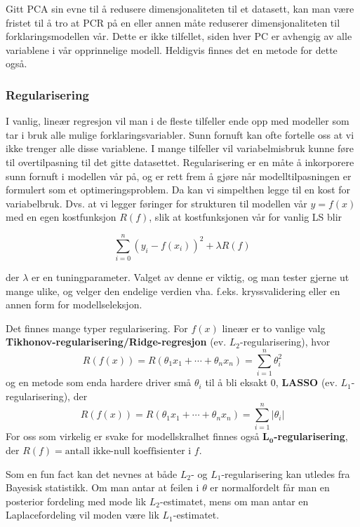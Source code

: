 Gitt PCA sin evne til å redusere dimensjonaliteten til et datasett, kan man være fristet til å tro at PCR på en eller annen måte reduserer dimensjonaliteten til forklaringsmodellen vår. Dette er ikke tilfellet, siden hver PC er avhengig av alle variablene i vår opprinnelige modell. Heldigvis finnes det en metode for dette også.

\subsubsection{Regularisering}
I vanlig, lineær regresjon vil man i de fleste tilfeller ende opp med modeller som tar i bruk alle mulige forklaringsvariabler. Sunn fornuft kan ofte fortelle oss at vi ikke trenger alle disse variablene. I mange tilfeller vil variabelmisbruk kunne føre til overtilpasning til det gitte datasettet. Regularisering er en måte å inkorporere sunn fornuft i modellen vår på, og er rett frem å gjøre når modelltilpasningen er formulert som et optimeringsproblem. Da kan vi simpelthen legge til en kost for variabelbruk. Dvs. at vi legger føringer for strukturen til modellen vår $y = f(x)$ med en egen kostfunksjon $R(f)$, slik at kostfunksjonen vår for vanlig LS blir

\begin{equation}
	\sum_{i=0}^{n}(y_i - f(x_i))^2 + \lambda R(f)
\end{equation}

der $\lambda$ er en tuningparameter. Valget av denne er viktig, og man tester gjerne ut mange ulike, og velger den endelige verdien vha. f.eks. kryssvalidering eller en annen form for modellseleksjon.

Det finnes mange typer regularisering. For $f(x)$ lineær er to vanlige valg \textbf{Tikhonov-regularisering/Ridge-regresjon} (ev. $L_2$-regularisering), hvor 
\begin{equation}
	R(f(x)) = R(\theta_1 x_1 + \cdots + \theta_n x_n) = \sum_{i = 1}^n \theta_i^2
\end{equation}
og en metode som enda hardere driver små $\theta_i$ til å bli eksakt 0, \textbf{LASSO} (ev. $L_1$-regularisering), der
\begin{equation}
	R(f(x)) = R(\theta_1 x_1 + \cdots + \theta_n x_n) = \sum_{i = 1}^n | \theta_i |
\end{equation}
For oss som virkelig er svake for modellskralhet finnes også \textbf{$\mathbf{L_0}$-regularisering}, der $R(f) = \textrm{antall ikke-null koeffisienter i } f$.

Som en fun fact kan det nevnes at både $L_2$- og $L_1$-regularisering kan utledes fra Bayesisk statistikk. Om man antar at feilen i $\theta$ er normalfordelt får man en posterior fordeling med mode lik $L_2$-estimatet, mens om man antar en Laplacefordeling vil moden være lik $L_1$-estimatet.

